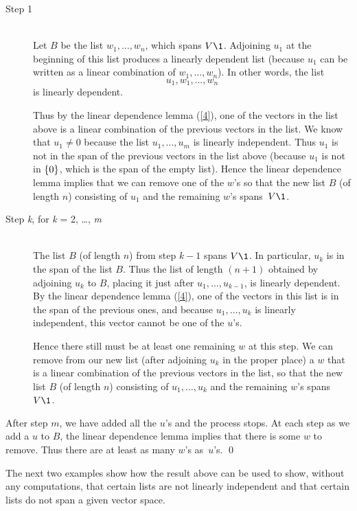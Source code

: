 \begin{description}
\item[Step 1] \ \\
Let $B$ be the list $w_1, \dots, w_n$, which spans $V\1$. Adjoining $u_1$ at the beginning of this list
produces a linearly dependent list (because $u_1$ can be written as a linear combination of $w_1, \ldots, w_n$).  In other words, the list
\[
u_1, w_1, \dots, w_n
\]
is linearly dependent.

Thus by the linear dependence lemma (\ref{4}), one of the vectors in the list above is a linear combination of the previous vectors in the list. We know that $u_1 \ne 0$ because the list $u_1, \dots, u_m$ is linearly independent. Thus $u_1$ is not in the span of the previous vectors in the list above (because $u_1$ is not in $\{0\}$, which is the span of the empty list). Hence the linear dependence lemma implies that we can remove one of the $w$'s so that the new list $B$ (of length $n$) consisting of $u_1$ and the remaining $w$'s spans~$V\1$.

\item[Step \textit{k}, for \textit{k} = 2, \ldots, \textit{m}] \ \\
The list $B$ (of length $n$) from step $k-1$ spans $V\1$. In particular, $u_k$ is in the span of the list $B$. Thus the list of length $(n+1)$ obtained by adjoining $u_k$ to $B$, placing it just after $u_1, \dots, u_{k-1}$, is linearly dependent.  By the linear dependence lemma (\ref{4}), one of the vectors in this list  is in the span of the previous ones, and because $u_1, \dots, u_k$ is linearly  independent, this vector cannot be one of the $u$'s.

Hence there still must be at least one remaining $w$ at this step. We can remove from our new list (after adjoining $u_k$ in the proper place) a $w$ that is a linear combination of the previous vectors in the list, so that the new list $B$ (of length $n$) consisting of $u_1, \dots, u_k$ and the
remaining $w$'s spans~$V\1$.
\end{description}

After  step $m$, we have added all the $u$'s and the process stops.  At each step as we add a $u$ to $B$, the linear dependence lemma implies that there is some $w$ to remove.  Thus  there are at least as many $w$'s as~$u$'s.
\qed

\pagebreak[3]

The next two examples show how the result above can be used to show, without any computations, that certain lists are not linearly independent and that certain lists do not span a given vector space.

